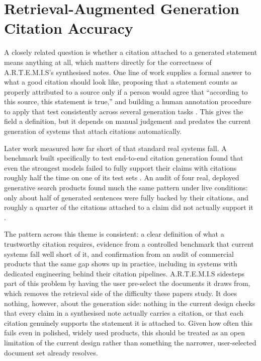 \documentclass[11pt,a4paper]{report}
\newcommand{\artemis}{A.R.T.E.M.I.S}
\begin{document}
\section{Retrieval-Augmented Generation Citation Accuracy}

A closely related question is whether a citation attached to a
generated statement means anything at all, which matters directly for
the correctness of \artemis{}'s synthesised notes. One line of work
supplies a formal answer to what a good citation should look like,
proposing that a statement counts as properly attributed to a source
only if a person would agree that ``according to this source, this
statement is true,'' and building a human annotation procedure to
apply that test consistently across several generation tasks
\autocite{rashkin2023measuring}. This gives the field a definition,
but it depends on manual judgement and predates the current generation
of systems that attach citations automatically.

Later work measured how far short of that standard real systems fall.
A benchmark built specifically to test end-to-end citation generation
found that even the strongest models failed to fully support their
claims with citations roughly half the time on one of its test sets
\autocite{gao2023enabling}. An audit of four real, deployed generative
search products found much the same pattern under live conditions:
only about half of generated sentences were fully backed by their
citations, and roughly a quarter of the citations attached to a claim
did not actually support it \autocite{liu2023evaluating}.

The pattern across this theme is consistent: a clear definition of
what a trustworthy citation requires, evidence from a controlled
benchmark that current systems fall well short of it, and confirmation
from an audit of commercial products that the same gap shows up in
practice, including in systems with dedicated engineering behind their
citation pipelines. \artemis{} sidesteps part of this problem by
having the user pre-select the documents it draws from, which removes
the retrieval side of the difficulty these papers study. It does
nothing, however, about the generation side: nothing in the current
design checks that every claim in a synthesised note actually carries
a citation, or that each citation genuinely supports the statement it
is attached to. Given how often this fails even in polished, widely
used products, this should be treated as an open limitation of the
current design rather than something the narrower, user-selected
document set already resolves.
\end{document}
